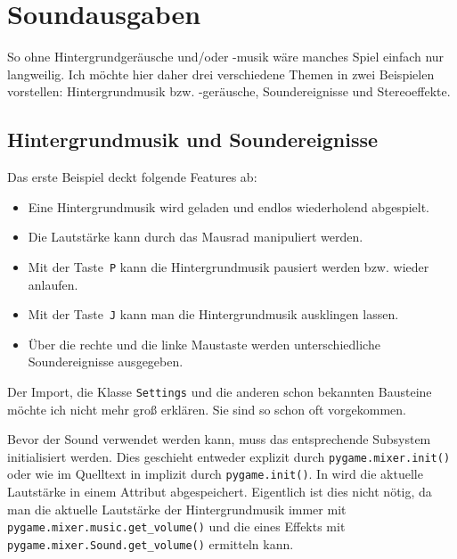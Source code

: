 \newpage
\section{Soundausgaben}
So ohne Hintergrundgeräusche und/oder -musik wäre manches Spiel einfach nur langweilig. Ich möchte hier daher drei verschiedene Themen in zwei Beispielen vorstellen: Hintergrundmusik bzw. -geräusche, Soundereignisse und Stereoeffekte.

\subsection{Hintergrundmusik und Soundereignisse}

Das erste Beispiel deckt folgende Features ab:
\begin{itemize}
	\item Eine Hintergrundmusik wird geladen und endlos wiederholend abgespielt.
	
	\item Die Lautstärke kann durch das Mausrad manipuliert werden. 
	
	\item Mit der Taste~\texttt{P} kann die Hintergrundmusik pausiert werden bzw. wieder anlaufen.
	
	\item Mit der Taste~\texttt{J} kann man die Hintergrundmusik ausklingen lassen.
	
	\item Über die rechte und die linke Maustaste werden unterschiedliche Soundereignisse ausgegeben.
\end{itemize}

Der Import, die Klasse \texttt{Settings} und die anderen schon bekannten Bausteine möchte ich nicht mehr groß erklären. Sie sind so schon oft vorgekommen. 


Bevor der Sound verwendet werden kann, muss das entsprechende Subsystem initialisiert werden. Dies geschieht entweder explizit durch \texttt{pygame.mixer.init()} oder wie im Quelltext in  implizit durch \texttt{pygame.init()}. In  wird die aktuelle Lautstärke in einem Attribut abgespeichert. Eigentlich ist dies nicht nötig, da man die aktuelle Lautstärke der Hintergrundmusik immer mit \texttt{pygame.mixer.music.get\_volume()} und die eines Effekts mit \texttt{pygame.mixer.Sound.get\_volume()} ermitteln kann.


